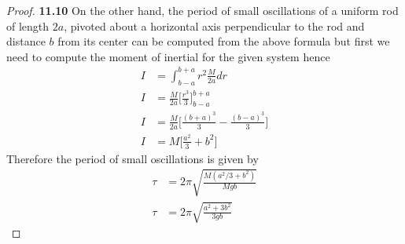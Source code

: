 \documentclass[11pt]{article}
\theoremstyle{definition}
\begin{document}
\begin{proof}{\textbf{11.10}}
    On the other hand, the period of small oscillations of a uniform rod of
    length $2a$, pivoted about a horizontal axis perpendicular to the rod and
    distance $b$ from its center can be computed from the above formula
    but first we need to compute the moment of inertial for the given system
    hence
    \begin{align*}
        I &= \int_{b-a}^{b+a} r^2 \frac{M}{2a} dr\\
        I &= \frac{M}{2a}\bigg[\frac{r^3}{3}\bigg]_{b-a}^{b+a}\\
        I &= \frac{M}{2a}\bigg[\frac{(b+a)^3}{3} - \frac{(b-a)^3}{3}\bigg]\\
        I &= M\bigg[\frac{a^2}{3} + b^2\bigg]
    \end{align*}
    Therefore the period of small oscillations is given by
    \begin{align*}
        \tau &= 2\pi \sqrt{\frac{M(a^2/3 + b^2)}{Mgb}}\\
        \tau &= 2\pi \sqrt{\frac{a^2 + 3b^2}{3gb}}
    \end{align*}
\end{proof}
\cleardoublepage
\end{document}
